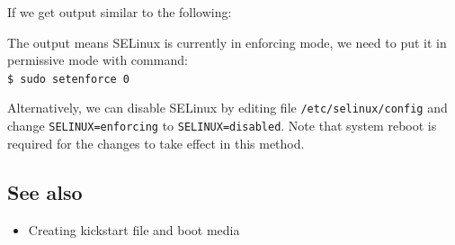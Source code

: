 If we get output similar to the following: \\

The output means SELinux is currently in enforcing mode, we need to put it in permissive mode with command: \\
\verb|$ sudo setenforce 0|

Alternatively, we can disable SELinux by editing file \verb|/etc/selinux/config| and change \verb|SELINUX=enforcing| to \verb|SELINUX=disabled|. Note that system reboot is required for the changes to take effect in this method.

\subsection*{See also}
\begin{itemize}
  \item Creating kickstart file and boot media
\end{itemize}

